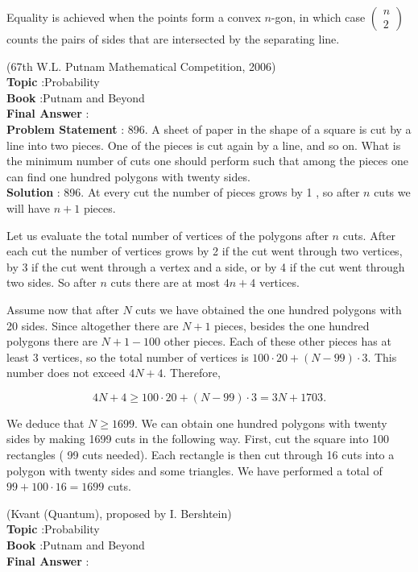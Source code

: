 \documentclass[10pt]{article}
\begin{document}
Equality is achieved when the points form a convex $n$-gon, in which case $\left(\begin{array}{l}n \\ 2\end{array}\right)$ counts the pairs of sides that are intersected by the separating line.

(67th W.L. Putnam Mathematical Competition, 2006)
\\
\textbf{Topic} :Probability\\
\textbf{Book} :Putnam and Beyond\\
\textbf{Final Answer} :\\


\textbf{Problem Statement} :
896. A sheet of paper in the shape of a square is cut by a line into two pieces. One of the pieces is cut again by a line, and so on. What is the minimum number of cuts one should perform such that among the pieces one can find one hundred polygons with twenty sides.
\\
\textbf{Solution} :
896. At every cut the number of pieces grows by 1 , so after $n$ cuts we will have $n+1$ pieces.

Let us evaluate the total number of vertices of the polygons after $n$ cuts. After each cut the number of vertices grows by 2 if the cut went through two vertices, by 3 if the cut went through a vertex and a side, or by 4 if the cut went through two sides. So after $n$ cuts there are at most $4 n+4$ vertices.

Assume now that after $N$ cuts we have obtained the one hundred polygons with 20 sides. Since altogether there are $N+1$ pieces, besides the one hundred polygons there are $N+1-100$ other pieces. Each of these other pieces has at least 3 vertices, so the total number of vertices is $100 \cdot 20+(N-99) \cdot 3$. This number does not exceed $4 N+4$. Therefore,

$$
4 N+4 \geq 100 \cdot 20+(N-99) \cdot 3=3 N+1703 .
$$

We deduce that $N \geq 1699$. We can obtain one hundred polygons with twenty sides by making 1699 cuts in the following way. First, cut the square into 100 rectangles ( 99 cuts needed). Each rectangle is then cut through 16 cuts into a polygon with twenty sides and some triangles. We have performed a total of $99+100 \cdot 16=1699$ cuts.

(Kvant (Quantum), proposed by I. Bershtein)
\\
\textbf{Topic} :Probability\\
\textbf{Book} :Putnam and Beyond\\
\textbf{Final Answer} :\\
\end{document}
